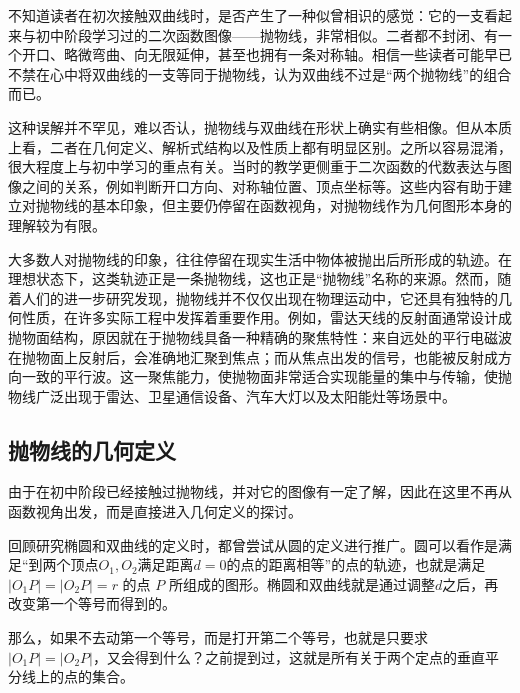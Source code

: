 
\begin{issues}
\issueDraft
\end{issues}


不知道读者在初次接触双曲线时，是否产生了一种似曾相识的感觉：它的一支看起来与初中阶段学习过的二次函数图像——抛物线，非常相似。二者都不封闭、有一个开口、略微弯曲、向无限延伸，甚至也拥有一条对称轴。相信一些读者可能早已不禁在心中将双曲线的一支等同于抛物线，认为双曲线不过是“两个抛物线”的组合而已。

这种误解并不罕见，难以否认，抛物线与双曲线在形状上确实有些相像。但从本质上看，二者在几何定义、解析式结构以及性质上都有明显区别。之所以容易混淆，很大程度上与初中学习的重点有关。当时的教学更侧重于二次函数的代数表达与图像之间的关系，例如判断开口方向、对称轴位置、顶点坐标等。这些内容有助于建立对抛物线的基本印象，但主要仍停留在函数视角，对抛物线作为几何图形本身的理解较为有限。

大多数人对抛物线的印象，往往停留在现实生活中物体被抛出后所形成的轨迹。在理想状态下，这类轨迹正是一条抛物线，这也正是“抛物线”名称的来源。然而，随着人们的进一步研究发现，抛物线并不仅仅出现在物理运动中，它还具有独特的几何性质，在许多实际工程中发挥着重要作用。例如，雷达天线的反射面通常设计成抛物面结构，原因就在于抛物线具备一种精确的聚焦特性：来自远处的平行电磁波在抛物面上反射后，会准确地汇聚到焦点；而从焦点出发的信号，也能被反射成方向一致的平行波。这一聚焦能力，使抛物面非常适合实现能量的集中与传输，使抛物线广泛出现于雷达、卫星通信设备、汽车大灯以及太阳能灶等场景中。

\subsection{抛物线的几何定义}

由于在初中阶段已经接触过抛物线，并对它的图像有一定了解，因此在这里不再从函数视角出发，而是直接进入几何定义的探讨。

回顾研究椭圆和双曲线的定义时，都曾尝试从圆的定义进行推广。圆可以看作是满足“到两个顶点$O_1,O_2$满足距离$d=0$的点的距离相等”的点的轨迹，也就是满足 $|O_1P| = |O_2P| = r$ 的点 $P$ 所组成的图形。椭圆和双曲线就是通过调整$d$之后，再改变第一个等号而得到的。

那么，如果不去动第一个等号，而是打开第二个等号，也就是只要求 $|O_1P| = |O_2P|$，又会得到什么？之前提到过，这就是所有关于两个定点的垂直平分线上的点的集合。

